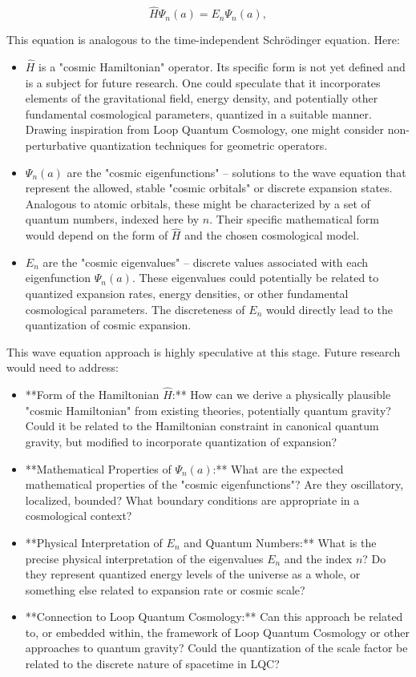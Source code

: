 \documentclass[12pt,a4paper]{article}
\begin{document}
	\begin{equation}
		\hat{H} \Psi_n(a) = E_n \Psi_n(a),
	\end{equation}
	
	This equation is analogous to the time-independent Schrödinger equation. Here:
	
	\begin{itemize}
		\item $\hat{H}$ is a "cosmic Hamiltonian" operator. Its specific form is not yet defined and is a subject for future research.  One could speculate that it incorporates elements of the gravitational field, energy density, and potentially other fundamental cosmological parameters, quantized in a suitable manner.  Drawing inspiration from Loop Quantum Cosmology, one might consider non-perturbative quantization techniques for geometric operators.
		\item $\Psi_n(a)$ are the "cosmic eigenfunctions" – solutions to the wave equation that represent the allowed, stable "cosmic orbitals" or discrete expansion states.  Analogous to atomic orbitals, these might be characterized by a set of quantum numbers, indexed here by $n$.  Their specific mathematical form would depend on the form of $\hat{H}$ and the chosen cosmological model.
		\item $E_n$ are the "cosmic eigenvalues" – discrete values associated with each eigenfunction $\Psi_n(a)$.  These eigenvalues could potentially be related to quantized expansion rates, energy densities, or other fundamental cosmological parameters.  The discreteness of $E_n$ would directly lead to the quantization of cosmic expansion.
	\end{itemize}
	
	This wave equation approach is highly speculative at this stage.  Future research would need to address:
	
	\begin{itemize}
		\item **Form of the Hamiltonian $\hat{H}$:**  How can we derive a physically plausible "cosmic Hamiltonian" from existing theories, potentially quantum gravity?  Could it be related to the Hamiltonian constraint in canonical quantum gravity, but modified to incorporate quantization of expansion?
		\item **Mathematical Properties of $\Psi_n(a)$:** What are the expected mathematical properties of the "cosmic eigenfunctions"?  Are they oscillatory, localized, bounded?  What boundary conditions are appropriate in a cosmological context?
		\item **Physical Interpretation of $E_n$ and Quantum Numbers:**  What is the precise physical interpretation of the eigenvalues $E_n$ and the index $n$?  Do they represent quantized energy levels of the universe as a whole, or something else related to expansion rate or cosmic scale?
		\item **Connection to Loop Quantum Cosmology:** Can this approach be related to, or embedded within, the framework of Loop Quantum Cosmology or other approaches to quantum gravity?  Could the quantization of the scale factor be related to the discrete nature of spacetime in LQC?
	\end{itemize}
	
\end{document}

